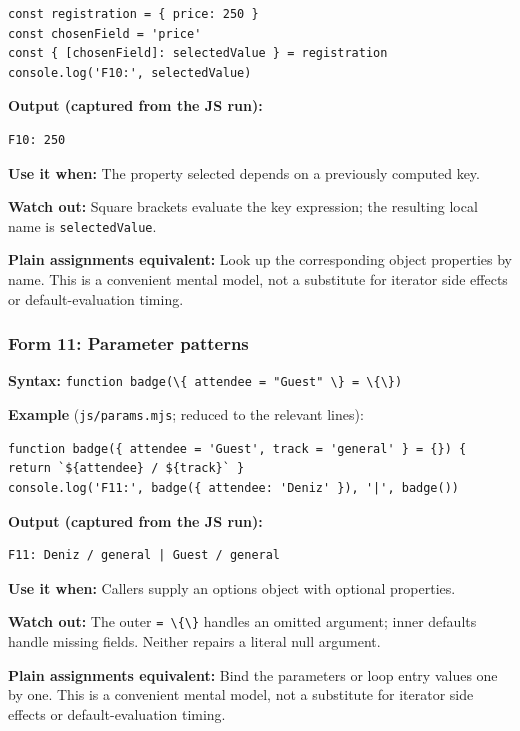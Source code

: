 \documentclass[
  10pt,
]{article}
\newcommand{\passthrough}[1]{#1}
\begin{document}
\begin{lstlisting}
const registration = { price: 250 }
const chosenField = 'price'
const { [chosenField]: selectedValue } = registration
console.log('F10:', selectedValue)
\end{lstlisting}

\textbf{Output (captured from the JS run):}

\begin{lstlisting}
F10: 250
\end{lstlisting}

\textbf{Use it when:} The property selected depends on a previously
computed key.

\textbf{Watch out:} Square brackets evaluate the key expression; the
resulting local name is \passthrough{\lstinline!selectedValue!}.

\textbf{Plain assignments equivalent:} Look up the corresponding object
properties by name. This is a convenient mental model, not a substitute
for iterator side effects or default-evaluation timing.

\subsubsection{Form 11: Parameter
patterns}\label{form-11-parameter-patterns}

\textbf{Syntax:}
\passthrough{\lstinline!function badge(\{ attendee = "Guest" \} = \{\})!}

\textbf{Example} (\passthrough{\lstinline!js/params.mjs!}; reduced to
the relevant lines):

\begin{lstlisting}
function badge({ attendee = 'Guest', track = 'general' } = {}) { return `${attendee} / ${track}` }
console.log('F11:', badge({ attendee: 'Deniz' }), '|', badge())
\end{lstlisting}

\textbf{Output (captured from the JS run):}

\begin{lstlisting}
F11: Deniz / general | Guest / general
\end{lstlisting}

\textbf{Use it when:} Callers supply an options object with optional
properties.

\textbf{Watch out:} The outer \passthrough{\lstinline!= \{\}!} handles
an omitted argument; inner defaults handle missing fields. Neither
repairs a literal null argument.

\textbf{Plain assignments equivalent:} Bind the parameters or loop entry
values one by one. This is a convenient mental model, not a substitute
for iterator side effects or default-evaluation timing.
\end{document}
